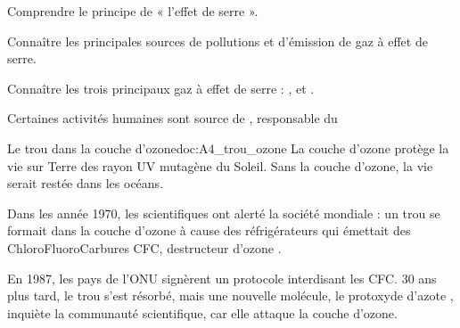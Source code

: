 \teteTermStssEnvi
{}

\begin{objectifs}
  \item Comprendre le principe de « l'effet de serre ».
  \item Connaître les principales sources de pollutions et d'émission de gaz à effet de serre.
  \item Connaître les trois principaux gaz à effet de serre : ,  et .
\end{objectifs}

\begin{contexte}
  Certaines activités humaines sont source de , responsable du 
  
\end{contexte}

\begin{doc}{Le trou dans la couche d'ozone}{doc:A4_trou_ozone}
  La couche d'ozone protège la vie sur Terre des rayon UV mutagène du Soleil.
  Sans la couche d'ozone, la vie serait restée dans les océans.

  Dans les année 1970, les scientifiques ont alerté la société mondiale : un trou se formait dans la couche d'ozone à cause des réfrigérateurs qui émettait des ChloroFluoroCarbures CFC, destructeur d'ozone .

  En 1987, les pays de l'ONU signèrent un protocole interdisant les CFC.
  30 ans plus tard, le trou s'est résorbé, mais une nouvelle molécule, le protoxyde d'azote , inquiète la communauté scientifique, car elle attaque la couche d'ozone.
\end{doc}

